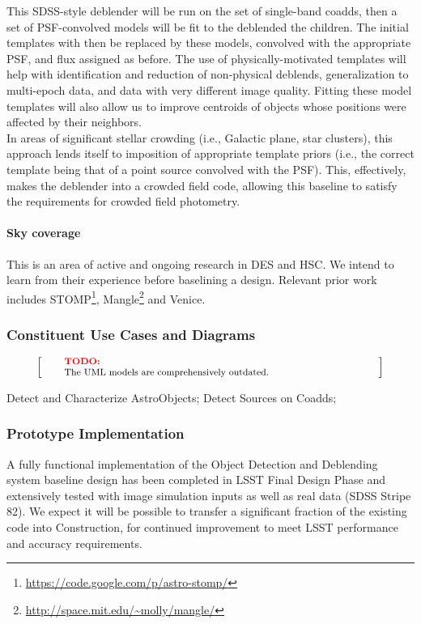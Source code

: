 \documentclass[12pt]{article}
\newenvironment{note}[1][Note]
{
  \begin{displaymath}
    \left[ \qquad
    \begin{minipage}[h]{.75\linewidth}
      \color{red} \footnotesize
      \textbf{#1:} \newline
      \color{black}
}
{
    \end{minipage}
    \normalsize
    \qquad \right]
  \end{displaymath}
}
\begin{document}
This SDSS-style deblender will be run on the set of single-band coadds, then a set of PSF-convolved models will be fit to the deblended the children. The initial templates with then be replaced by these models, convolved with the appropriate PSF, and flux assigned as before. The use of physically-motivated templates will help with identification and reduction of non-physical deblends, generalization to multi-epoch data, and data with very different image quality.  Fitting these model templates will also allow us to improve centroids of objects whose positions were affected by their neighbors. %
\\

In areas of significant stellar crowding (i.e., Galactic plane, star clusters), this approach lends itself to imposition of appropriate template priors (i.e., the correct template being that of a point source convolved with the PSF). This, effectively, makes the deblender into a crowded field code, allowing this baseline to satisfy the requirements for crowded field photometry.

\paragraph{Sky coverage}

This is an area of active and ongoing research in DES and HSC\@. We intend to learn from their experience before baselining a design. Relevant prior work includes STOMP\footnote{\url{https://code.google.com/p/astro-stomp/}}, Mangle\footnote{\url{http://space.mit.edu/~molly/mangle/}} and Venice.

\subsubsection{Constituent Use Cases and Diagrams}

\begin{note}[TODO]
The UML models are comprehensively outdated.
\end{note}

Detect and Characterize AstroObjects;
Detect Sources on Coadds;

\subsubsection{Prototype Implementation}

A fully functional implementation of the Object Detection and Deblending system baseline design has been completed in LSST Final Design Phase and extensively tested with image simulation inputs as well as real data (SDSS Stripe 82). We expect it will be possible to transfer a significant fraction of the existing code into Construction, for continued improvement to meet LSST performance and accuracy requirements. %
\\
\end{document}
